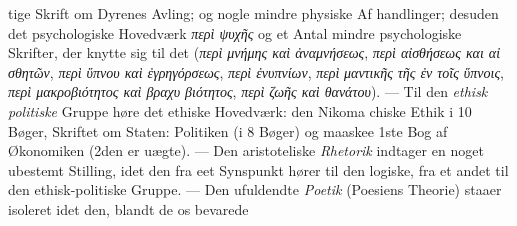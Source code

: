 \documentclass[12pt,a4paper]{book}
\newcommand{\gk}[1]{\textit{#1}}
\begin{document}
tige Skrift om Dyrenes Avling; og nogle mindre physiske Af\-%
handlinger; desuden det psychologiske Hovedværk \gk{περὶ ψυχῆς}
og et Antal mindre psychologiske Skrifter, der knytte sig til
det (\gk{περὶ μνήμης καὶ ἀναμνήσεως}, \gk{περὶ αἰσθήσεως και αἰ\-%
σθητῶν}, \gk{περὶ ὕπνου καὶ ἐγρηγόρσεως}, \gk{περὶ ἐνυπνίων}, \gk{περὶ}
\gk{μαντικῆς τῆς ἐν τοῖς ὕπνοις}, \gk{περὶ μακροβιότητος καὶ βραχυ\-%
βιότητος}, \gk{περὶ ζωῆς καὶ θανάτου}). --- Til den \emph{ethisk\-%
politiske} Gruppe høre det ethiske Hovedværk: den Nikoma\-%
chiske Ethik i 10 Bøger, Skriftet om Staten: Politiken (i 8
Bøger) og maaskee 1ste Bog af Økonomiken (2den er uægte).
--- Den aristoteliske \emph{Rhetorik} indtager en noget ubestemt
Stilling, idet den fra eet Synspunkt hører til den logiske, fra et
andet til den ethisk-politiske Gruppe. --- Den ufuldendte \emph{Poetik}
(Poesiens Theorie) staaer isoleret idet den, blandt de os bevarede
\end{document}
